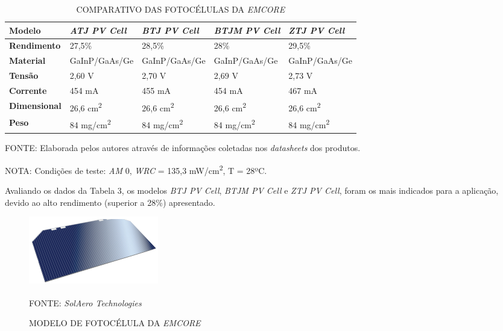\documentclass[
	12pt,				%
	openright,			%
	oneside,			%
	a4paper,			%
	english,			%
	french,				%
	spanish,			%
	brazil,				%
	oldfontcommands
	]{abntex2}
\begin{document}
	\begin{table}[th]
	\caption{COMPARATIVO DAS FOTOCÉLULAS DA \textit{EMCORE}}
	\begin{tabular}{p{2.5cm}|p{3.1cm}|p{3.1cm}|p{3.1cm}|p{3.1cm}}
		\textbf{Modelo} & \textit{\textbf{ATJ PV Cell}} & \textit{\textbf{BTJ PV Cell}} & \textit{\textbf{BTJM PV Cell}} & \textit{\textbf{ZTJ PV Cell}} \\
		\hline
		\textbf{Rendimento} & 27,5\% & 28,5\% & 28\% & 29,5\% \\
		\hline
		\textbf{Material} & GaInP/GaAs/Ge & GaInP/GaAs/Ge & GaInP/GaAs/Ge & GaInP/GaAs/Ge\\
		\hline
		\textbf{Tensão} & 2,60 V & 2,70 V & 2,69 V & 2,73 V\\
		\hline
		\textbf{Corrente} & 454 mA & 455 mA & 454 mA & 467 mA\\
		\hline
		\textbf{Dimensional} & 26,6 cm\textsuperscript{2} & 26,6 cm\textsuperscript{2} & 26,6 cm\textsuperscript{2} & 26,6 cm\textsuperscript{2}\\
		\hline
		\textbf{Peso} & 84 mg/cm\textsuperscript{2} & 84 mg/cm\textsuperscript{2} & 84 mg/cm\textsuperscript{2} & 84 mg/cm\textsuperscript{2}\\
	\end{tabular}
	
	\begin{small}
	\vspace{3pt}
		FONTE: Elaborada pelos autores através de informações coletadas nos \textit{datasheets} dos produtos.
	\end{small}
	\begin{footnotesize}
		NOTA: Condições de teste: \textit{AM} 0, \textit{WRC} = 135,3 mW/cm\textsuperscript{2}, T = 28ºC.
	\end{footnotesize}
	\end{table}	
	\pagebreak
	
	Avaliando os dados da Tabela 3, os modelos \textit{BTJ PV Cell}, \textit{BTJM PV Cell} e \textit{ZTJ PV Cell}, foram os mais indicados para a aplicação, devido ao alto rendimento (superior a 28\%) apresentado.
	
	\begin{figure}[th]
		\caption{MODELO DE FOTOCÉLULA DA \textit{EMCORE}}
		\centering
		\includegraphics[width=0.5\linewidth]{./figs/ZTJ}
			
		\begin{small}
			FONTE: \textit{SolAero Technologies}\textsuperscript{\cite{Emcore3}}
		\end{small}		
	\end{figure}
	
\end{document}
